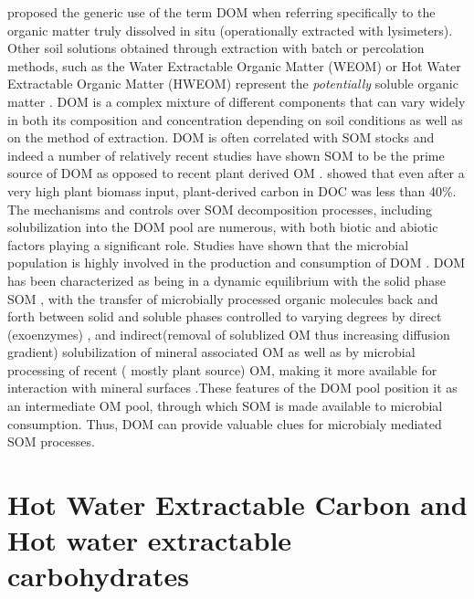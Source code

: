 \documentclass[12pt]{report}
\begin{document}
	\citet{zsolnay2003} proposed the generic use of the term DOM when referring specifically to the organic matter truly dissolved in situ (operationally extracted with lysimeters). Other soil solutions obtained through extraction with batch or percolation methods, such as the Water Extractable Organic Matter (WEOM) or Hot Water Extractable Organic Matter (HWEOM) represent the \textit{potentially} soluble organic matter \citep{marschner2003}. DOM is a complex mixture of different components that can vary widely in both its composition and concentration depending on soil conditions  as well as on the method of extraction\citep{bolan2011}. DOM is often  correlated with SOM stocks and indeed a number of relatively recent studies have shown SOM to be the prime source of DOM as opposed to  recent plant derived OM \citep{malik2013, kaiser2012}. \citet{malik2013}showed that  even after a very high plant biomass input, plant-derived carbon in DOC was less than 40\%.\\
	The mechanisms and controls over SOM decomposition processes, including solubilization  into the DOM pool are numerous, with both biotic and abiotic factors playing a significant role\citep{kalbitz2000, bolan2011}. Studies have shown that the microbial population is highly involved in the production and consumption of DOM \citep{marschnerp2002, malik2013, guggenberger1998}.  DOM has been characterized as being in a dynamic equilibrium with the solid phase SOM \citep{roth2019, kaiser2012},  with the transfer of microbially processed organic molecules back and forth between solid and soluble phases controlled to varying degrees by  direct (exoenzymes) \citep{guggenberger1998},  and indirect(removal of solublized OM thus increasing diffusion gradient) solubilization of mineral associated OM as well as by microbial processing of recent ( mostly plant source) OM, making it more available for interaction with mineral surfaces \citep{kalbitz2003, kalbitz2008}.These features of the DOM pool position it as an intermediate OM pool, through which SOM is made available to microbial consumption. Thus, DOM can provide valuable clues for microbialy mediated SOM processes. \\
	
\section{Hot Water Extractable Carbon and Hot water extractable carbohydrates}
\end{document}
